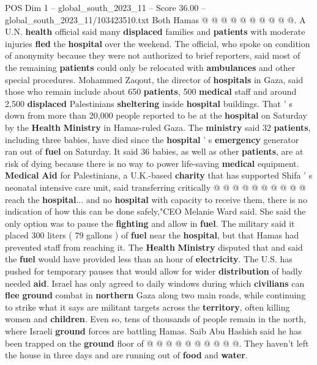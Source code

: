 \begin{textsample}{POS Dim 1 – global\_south\_2023\_11 – Score 36.00 – global\_south\_2023\_11/103423510.txt}
Both Hamas @ @ @ @ @ @ @ @ @ @.
A U.N. \textbf{health} official said many \textbf{displaced} families and \textbf{patients} with moderate injuries \textbf{fled} the \textbf{hospital} over the weekend.
The official, who spoke on condition of anonymity because they were not authorized to brief reporters, said most of the remaining \textbf{patients} could only be relocated with \textbf{ambulances} and other special procedures.
Mohammed Zaqout, the director of \textbf{hospitals} in Gaza, said those who remain include about 650 \textbf{patients}, 500 \textbf{medical} staff and around 2,500 \textbf{displaced} Palestinians \textbf{sheltering} inside \textbf{hospital} buildings.
That ' s down from more than 20,000 people reported to be at the \textbf{hospital} on Saturday by the \textbf{Health} \textbf{Ministry} in Hamas-ruled Gaza.
The \textbf{ministry} said 32 \textbf{patients}, including three babies, have died since the \textbf{hospital} ' s \textbf{emergency} generator ran out of \textbf{fuel} on Saturday.
It said 36 babies, as well as other \textbf{patients}, are at risk of dying because there is no way to power life-saving \textbf{medical} equipment. \textbf{Medical} \textbf{Aid} for Palestinians, a U.K.-based \textbf{charity} that has supported Shifa ' s neonatal intensive care unit, said transferring critically @ @ @ @ @ @ @ @ @ @ reach the \textbf{hospital}... and no \textbf{hospital} with capacity to receive them, there is no indication of how this can be done safely,"CEO Melanie Ward said.
She said the only option was to pause the \textbf{fighting} and allow in \textbf{fuel}.
The military said it placed 300 liters ( 79 gallons ) of \textbf{fuel} near the \textbf{hospital}, but that Hamas had prevented staff from reaching it.
The \textbf{Health} \textbf{Ministry} disputed that and said the \textbf{fuel} would have provided less than an hour of \textbf{electricity}.
The U.S. has pushed for temporary pauses that would allow for wider \textbf{distribution} of badly needed \textbf{aid}.
Israel has only agreed to daily windows during which \textbf{civilians} can \textbf{flee} \textbf{ground} combat in \textbf{northern} Gaza along two main roads, while continuing to strike what it says are militant targets across the \textbf{territory}, often killing women and \textbf{children}.
Even so, tens of thousands of people remain in the north, where Israeli \textbf{ground} forces are battling Hamas.
Saib Abu Hashish said he has been trapped on the \textbf{ground} floor of @ @ @ @ @ @ @ @ @ @.
They haven't left the house in three days and are running out of \textbf{food} and \textbf{water}.

\end{textsample}
